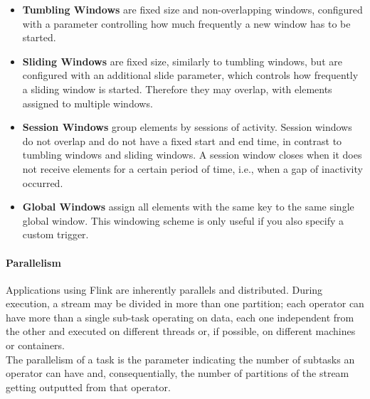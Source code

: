 \begin{itemize}
    \item \textbf{Tumbling Windows} are fixed size and non-overlapping windows, configured with a parameter controlling how much frequently a new window has to be started.
    \item \textbf{Sliding Windows} are fixed size, similarly to tumbling windows, but are configured with an additional slide parameter, which controls how frequently a sliding window is started. Therefore they may overlap, with elements assigned to multiple windows.
    \item \textbf{Session Windows} group elements by sessions of activity. Session windows do not overlap and do not have a fixed start and end time, in contrast to tumbling windows and sliding windows. A session window closes when it does not receive elements for a certain period of time, i.e., when a gap of inactivity occurred.
    \item \textbf{Global Windows} assign all elements with the same key to the same single global window. This windowing scheme is only useful if you also specify a custom trigger. 
\end{itemize}



\paragraph{Parallelism} \label{ParallelismFlink}

Applications using Flink are inherently parallels and distributed. During execution, a stream may be divided in more than one partition; each operator can have more than a single sub-task operating on data, each one independent from the other and executed on different threads or, if possible, on different machines or containers.\\
The parallelism of a task is the parameter indicating the number of subtasks an operator can have and, consequentially, the number of partitions of the stream getting outputted from that operator.\\

